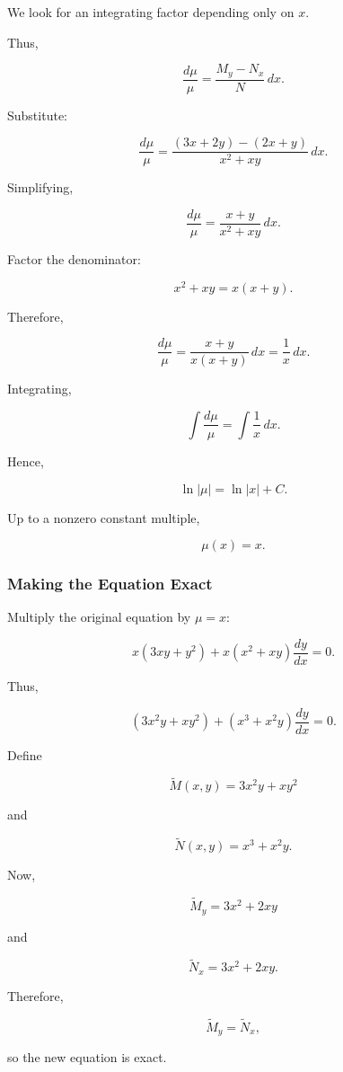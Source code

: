 \documentclass[11pt]{article}
\begin{document}
We look for an integrating factor depending only on $x$.

Thus,

\[
\frac{d\mu}{\mu}
=
\frac{M_y-N_x}{N}\,dx.
\]

Substitute:

\[
\frac{d\mu}{\mu}
=
\frac{(3x+2y)-(2x+y)}
{x^2+xy}\,dx.
\]

Simplifying,

\[
\frac{d\mu}{\mu}
=
\frac{x+y}{x^2+xy}\,dx.
\]

Factor the denominator:

\[
x^2+xy=x(x+y).
\]

Therefore,

\[
\frac{d\mu}{\mu}
=
\frac{x+y}{x(x+y)}\,dx
=
\frac{1}{x}\,dx.
\]

Integrating,

\[
\int\frac{d\mu}{\mu}
=
\int\frac{1}{x}\,dx.
\]

Hence,

\[
\ln|\mu|
=
\ln|x|+C.
\]

Up to a nonzero constant multiple,

\[
\boxed{\mu(x)=x}.
\]

\subsubsection{Making the Equation Exact}

Multiply the original equation by $\mu=x$:

\[
x(3xy+y^2)
+
x(x^2+xy)\frac{dy}{dx}
=0.
\]

Thus,

\[
(3x^2y+xy^2)
+
(x^3+x^2y)\frac{dy}{dx}
=0.
\]

Define

\[
\widetilde{M}(x,y)
=
3x^2y+xy^2
\]

and

\[
\widetilde{N}(x,y)
=
x^3+x^2y.
\]

Now,

\[
\widetilde{M}_y
=
3x^2+2xy
\]

and

\[
\widetilde{N}_x
=
3x^2+2xy.
\]

Therefore,

\[
\widetilde{M}_y
=
\widetilde{N}_x,
\]

so the new equation is exact.

\end{document}

